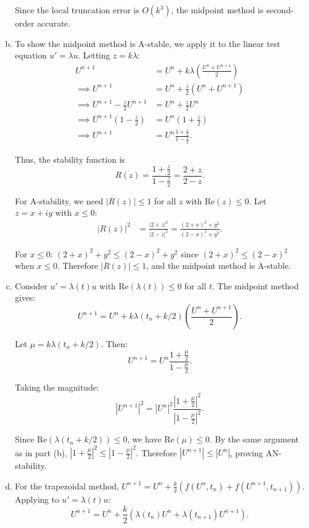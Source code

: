 \documentclass{article}
\begin{document}
\begin{enumerate}[(a)]
  Since the local truncation error is $O(k^3)$, the midpoint method is second-order accurate.

  \item To show the midpoint method is A-stable, we apply it to the linear test equation $u' = \lambda u$. Letting $z = k\lambda$:
  \begin{align*}
  U^{n+1} &= U^n + k\lambda\left(\frac{U^n + U^{n+1}}{2}\right) \\
  \implies U^{n+1} &= U^n + \frac{z}{2}(U^n + U^{n+1}) \\
  \implies U^{n+1} - \frac{z}{2}U^{n+1} &= U^n + \frac{z}{2}U^n \\
  \implies U^{n+1}\left(1 - \frac{z}{2}\right) &= U^n\left(1 + \frac{z}{2}\right) \\
  \implies U^{n+1} &= U^n \frac{1 + \frac{z}{2}}{1 - \frac{z}{2}}.
  \end{align*}

  Thus, the stability function is
  \[
  R(z) = \frac{1 + \frac{z}{2}}{1 - \frac{z}{2}} = \frac{2 + z}{2 - z}.
  \]

  For A-stability, we need $|R(z)| \leq 1$ for all $z$ with $\text{Re}(z) \leq 0$. Let $z = x + iy$ with $x \leq 0$:
  \begin{align*}
  |R(z)|^2 &= \frac{|2 + z|^2}{|2 - z|^2} = \frac{(2+x)^2 + y^2}{(2-x)^2 + y^2}.
  \end{align*}

  For $x \leq 0$: $(2+x)^2 + y^2 \leq (2-x)^2 + y^2$ since $(2+x)^2 \leq (2-x)^2$ when $x \leq 0$. Therefore $|R(z)| \leq 1$, and the midpoint method is A-stable.

  \item Consider $u' = \lambda(t) u$ with $\text{Re}(\lambda(t)) \leq 0$ for all $t$. The midpoint method gives:
  \[
  U^{n+1} = U^n + k\lambda(t_n + k/2)\left(\frac{U^n + U^{n+1}}{2}\right).
  \]

  Let $\mu = k\lambda(t_n + k/2)$. Then:
  \[
  U^{n+1} = U^n \frac{1 + \frac{\mu}{2}}{1 - \frac{\mu}{2}}.
  \]

  Taking the magnitude:
  \[
  |U^{n+1}|^2 = |U^n|^2 \frac{|1 + \frac{\mu}{2}|^2}{|1 - \frac{\mu}{2}|^2}.
  \]

  Since $\text{Re}(\lambda(t_n + k/2)) \leq 0$, we have $\text{Re}(\mu) \leq 0$. By the same argument as in part (b), $|1 + \frac{\mu}{2}|^2 \leq |1 - \frac{\mu}{2}|^2$. Therefore $|U^{n+1}| \leq |U^n|$, proving AN-stability.

  \item For the trapezoidal method, $U^{n+1} = U^n + \frac{k}{2}(f(U^n, t_n) + f(U^{n+1}, t_{n+1}))$. Applying to $u' = \lambda(t)u$: %
  \[
  U^{n+1} = U^n + \frac{k}{2}(\lambda(t_n)U^n + \lambda(t_{n+1})U^{n+1}).
  \]


\end{enumerate}
\end{document}
